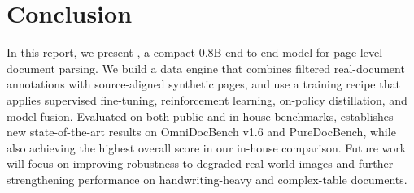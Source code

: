 \section{Conclusion}

In this report, we present \ours{}, a compact 0.8B end-to-end model for page-level document parsing. We build a data engine that combines filtered real-document annotations with source-aligned synthetic pages, and use a training recipe that applies supervised fine-tuning, reinforcement learning, on-policy distillation, and model fusion. Evaluated on both public and in-house benchmarks, \ours{} establishes new state-of-the-art results on OmniDocBench v1.6 and PureDocBench, while also achieving the highest overall score in our in-house comparison. Future work will focus on improving robustness to degraded real-world images and further strengthening performance on handwriting-heavy and complex-table documents.
